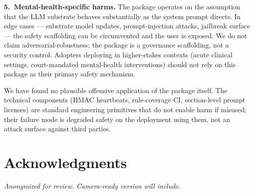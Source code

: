 \documentclass[letterpaper]{article} %
\begin{document}
\noindent\textbf{5.~Mental-health-specific harms.} The package operates on the assumption that the LLM substrate behaves substantially as the system prompt directs. In edge cases --- substrate model updates, prompt-injection attacks, jailbreak surface --- the safety scaffolding can be circumvented and the user is exposed. We do not claim adversarial-robustness; the package is a governance scaffolding, not a security control. Adopters deploying in higher-stakes contexts (acute clinical settings, court-mandated mental-health interventions) should not rely on this package as their primary safety mechanism.

We have found no plausible offensive application of the package itself. The technical components (HMAC heartbeats, rule-coverage CI, section-level prompt licenses) are standard engineering primitives that do not enable harm if misused; their failure mode is degraded safety on the deployment using them, not an attack surface against third parties.

\section*{Acknowledgments}

\textit{Anonymized for review. Camera-ready version will include.}


\end{document}

